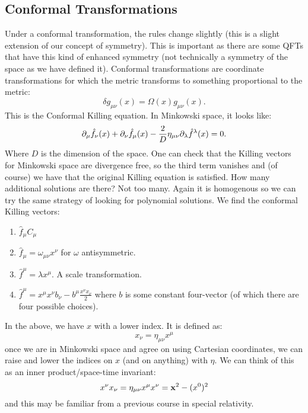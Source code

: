 \subsection{Conformal Transformations}
Under a conformal transformation, the rules change slightly (this is a slight extension of our concept of symmetry). This is important as there are some QFTs that have this kind of enhanced symmetry (not technically a symmetry of the space as we have defined it). Conformal transformations are coordinate transformations for which the metric transforms to something proportional to the metric:
\begin{equation}
    \delta g_{\mu\nu}(x) = \Omega(x) g_{\mu\nu}(x).
\end{equation}
This is the Conformal Killing equation. In Minkowski space, it looks like:
\begin{equation}
    \partial_\mu \hat{f}_\nu(x) + \partial_\nu \hat{f}_\mu (x) - \frac{2}{D}\eta_{\mu\nu}\partial_\lambda \hat{f}^\lambda (x) = 0.
\end{equation}
Where $D$ is the dimension of the space. One can check that the Killing vectors for Minkowski space are divergence free, so the third term vanishes and (of course) we have that the original Killing equation is satisfied. How many additional solutions are there? Not too many. Again it is homogenous so we can try the same strategy of looking for polynomial solutions. We find the conformal Killing vectors:
\begin{enumerate}
    \item $\hat{f}_\mu  C_\mu$
    \item $\hat{f}_\mu = \omega_{\mu\nu}x^\nu$ for $\omega$ antisymmetric.
    \item $\hat{f}^\mu = \lambda x^\mu$. A scale transformation.
    \item $\hat{f}^\mu = x^\mu x^\nu b_\nu - b^\mu \frac{x^\nu x_\nu}{2}$ where $b$ is some constant four-vector (of which there are four possible choices).
\end{enumerate}
In the above, we have $x$ with a lower index. It is defined as:
\begin{equation}
    x_\nu = \eta_{\mu\nu}x^\mu
\end{equation}
once we are in Minkowski space and agree on using Cartesian coordinates, we can raise and lower the indices on $x$ (and on anything) with $\eta$. We can think of this as an inner product/space-time invariant:
\begin{equation}
    x^\nu x_\nu = \eta_{\mu\nu}x^\mu x^\nu = \mathbf{x}^2 - (x^{0})^2
\end{equation}
and this may be familiar from a previous course in special relativity.

